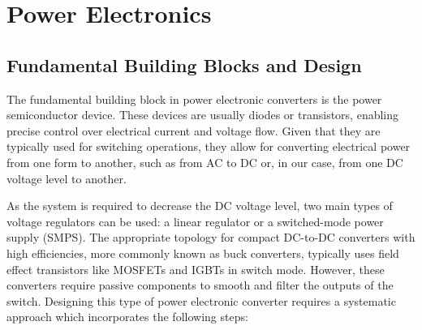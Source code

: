 \section{Power Electronics}
    \subsection{Fundamental Building Blocks and Design}
        The fundamental building block in power electronic converters is the power semiconductor device. These devices are usually diodes or transistors, enabling precise control over electrical current and voltage flow. Given that they are typically used for switching operations, they allow for converting electrical power from one form to another, such as from AC to DC or, in our case, from one DC voltage level to another. 

        As the system is required to decrease the DC voltage level, two main types of voltage regulators can be used: a linear regulator or a switched-mode power supply (SMPS). The appropriate topology for compact DC-to-DC converters with high efficiencies, more commonly known as buck converters, typically uses field effect transistors like MOSFETs and IGBTs in switch mode. However, these converters require passive components to smooth and filter the outputs of the switch. Designing this type of power electronic converter requires a systematic approach which incorporates the following steps:

